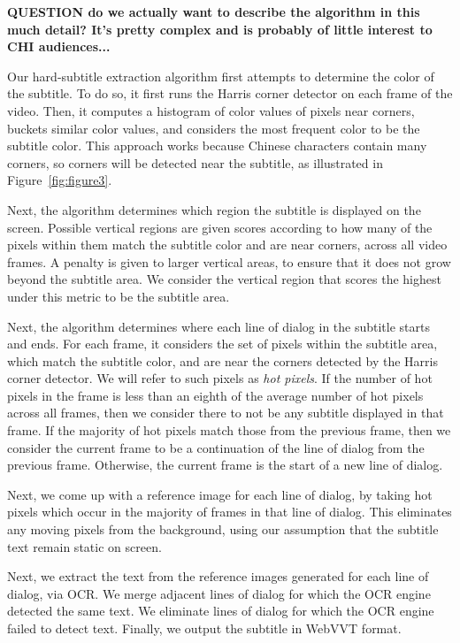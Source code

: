 \documentclass{sigchi}
\begin{document}
\textbf{QUESTION do we actually want to describe the algorithm in this
much detail? It's pretty complex and is probably of little interest to CHI audiences...}

Our hard-subtitle extraction algorithm first attempts to determine the color
of the subtitle. To do so, it first runs the Harris corner detector \cite{harris1988combined}
on each frame of the video. Then, it computes a histogram of color values of pixels near corners, buckets similar color values, and considers the most frequent color to be the subtitle color. This approach works because Chinese characters contain many corners,
so corners will be detected near the subtitle, as illustrated
in Figure~\ref{fig:figure3}.

Next, the algorithm determines which region the subtitle is displayed on the screen. Possible vertical regions are given scores according to how many of the pixels within them match the subtitle color and are
near corners, across all video frames. A penalty is given to larger vertical
areas, to ensure that it does not grow beyond the subtitle area. We consider the vertical region
that scores the highest under this metric to be the subtitle area.

Next, the algorithm determines where each line of dialog in the subtitle
starts and ends. For each frame, it considers the set of pixels within the subtitle area,
which match the subtitle color, and are near the corners detected by the Harris corner detector. We will refer to such pixels as \emph{hot pixels}. If the number of hot pixels in the frame is less than
an eighth of the average number of hot pixels across all frames,
then we consider there to not be any subtitle displayed in that frame.
If the majority of hot pixels match those from the previous frame, then
we consider the current frame to be a continuation of the line of dialog from the previous frame.
Otherwise, the current frame is the start of a new line of dialog.

Next, we come up with a reference image for each line of dialog, by taking hot pixels which occur in the majority of frames in that line of dialog. This eliminates any moving pixels from the background, using our
assumption that the subtitle text remain static on screen.

Next, we extract the text from the reference images generated for each line of dialog, via OCR. We merge adjacent lines of dialog for which the OCR engine detected the same text. We eliminate lines of dialog for which the OCR engine failed to detect text. Finally, we output the subtitle in WebVVT format.
\end{document}
